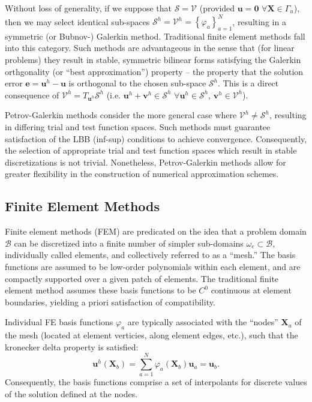 Without loss of generality, if we suppose that $\mathcal{S} = \mathcal{V}$ (provided $\mathbf{u} = \mathbf{0} \, \, \forall \mathbf{X} \in \Gamma_u$), then we may select identical sub-spaces $\mathcal{S}^h = \mathcal{V}^h = \left\{ \varphi_a \right\}_{a = 1}^{N}$, resulting in a symmetric (or Bubnov-) Galerkin method. Traditional finite element methods fall into this category. Such methods are advantageous in the sense that (for linear problems) they result in stable, symmetric bilinear forms satisfying the Galerkin orthgonality (or ``best approximation'') property -- the property that the solution error $\mathbf{e} = \mathbf{u}^h - \mathbf{u}$ is orthogonal to the chosen sub-space $\mathcal{S}^h$. This is a direct consequence of $\mathcal{V}^h = T_{\mathbf{u}^h} \mathcal{S}^h$ (i.e. $\mathbf{u}^h + \mathbf{v}^h \in \mathcal{S}^h \, \, \forall \mathbf{u}^h \in \mathcal{S}^h, \, \mathbf{v}^h \in \mathcal{V}^h$).

Petrov-Galerkin methods consider the more general case where $\mathcal{V}^h \neq \mathcal{S}^h$, resulting in differing trial and test function spaces. Such methods must guarantee satisfaction of the LBB (inf-sup) conditions to achieve convergence. Consequently, the selection of appropriate trial and test function spaces which result in stable discretizations is not trivial. Nonetheless, Petrov-Galerkin methods allow for greater flexibility in the construction of numerical approximation schemes.

\subsection{Finite Element Methods}

Finite element methods (FEM) are predicated on the idea that a problem domain $\mathcal{B}$ can be discretized into a finite number of simpler sub-domains $\omega_e \subset \mathcal{B}$, individually called elements, and collectively referred to as a ``mesh.'' The basis functions are assumed to be low-order polynomials within each element, and are compactly supported over a given patch of elements. The traditional finite element method assumes these basis functions to be $C^0$ continuous at element boundaries, yielding a priori satisfaction of compatibility.

Individual FE basis functions $\varphi_a$ are typically associated with the ``nodes'' $\mathbf{X}_a$ of the mesh (located at element verticies, along element edges, etc.), such that the kronecker delta property is satisfied:
\begin{equation}
	\mathbf{u}^h (\mathbf{X}_b) = \sum_{a = 1}^N \varphi_a (\mathbf{X}_b) \mathbf{u}_a = \mathbf{u}_b.
\end{equation}
Consequently, the basis functions comprise a set of interpolants for discrete values of the solution defined at the nodes.

